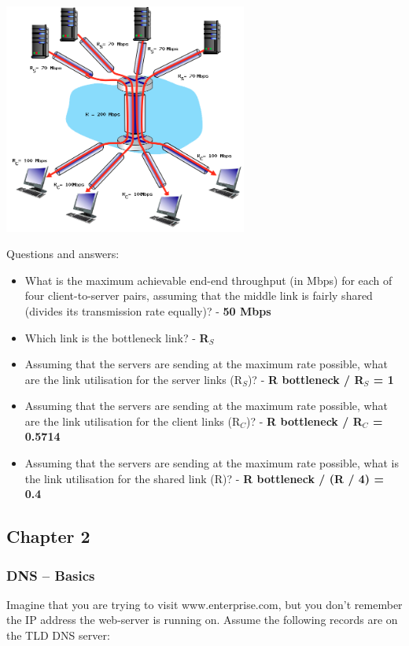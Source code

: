 \documentclass{article}
\begin{document}
\centerline{\includegraphics[width=8cm]{./assets/ex5}}

\noindent Questions and answers:

\begin{itemize}
	\item What is the maximum achievable end-end throughput (in Mbps) for each of four client-to-server pairs, assuming that the middle link is fairly shared (divides its transmission rate equally)? - \textbf{50 Mbps}
	\item Which link is the bottleneck link? - \textbf{R$_S$}
	\item Assuming that the servers are sending at the maximum rate possible, what are the link utilisation for the server links (R$_S$)? - \textbf{R bottleneck / R$_S$ = 1}
	\item Assuming that the servers are sending at the maximum rate possible, what are the link utilisation for the client links (R$_C$)? - \textbf{R bottleneck / R$_C$ = 0.5714}
	\item Assuming that the servers are sending at the maximum rate possible, what is the link utilisation for the shared link (R)? - \textbf{R bottleneck / (R / 4) = 0.4}
\end{itemize}

\subsection{Chapter 2}
\subsubsection{DNS -- Basics}
Imagine that you are trying to visit www.enterprise.com, but you don't remember the IP address the web-server is running on.
Assume the following records are on the TLD DNS server:
\end{document}
